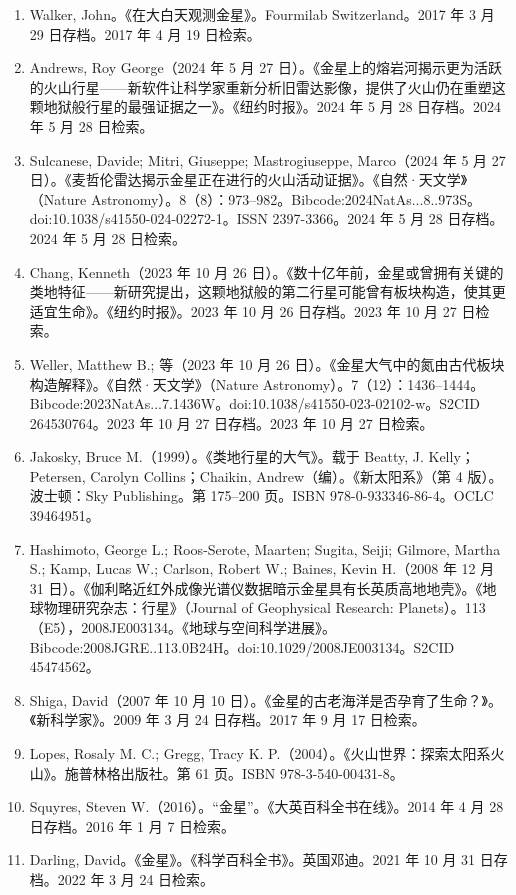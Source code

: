 \begin{enumerate}
\item Walker, John。《在大白天观测金星》。Fourmilab Switzerland。2017 年 3 月 29 日存档。2017 年 4 月 19 日检索。
\item Andrews, Roy George（2024 年 5 月 27 日）。《金星上的熔岩河揭示更为活跃的火山行星——新软件让科学家重新分析旧雷达影像，提供了火山仍在重塑这颗地狱般行星的最强证据之一》。《纽约时报》。2024 年 5 月 28 日存档。2024 年 5 月 28 日检索。
\item Sulcanese, Davide; Mitri, Giuseppe; Mastrogiuseppe, Marco（2024 年 5 月 27 日）。《麦哲伦雷达揭示金星正在进行的火山活动证据》。《自然·天文学》（Nature Astronomy）。8（8）：973–982。Bibcode:2024NatAs...8..973S。doi:10.1038/s41550-024-02272-1。ISSN 2397-3366。2024 年 5 月 28 日存档。2024 年 5 月 28 日检索。
\item Chang, Kenneth（2023 年 10 月 26 日）。《数十亿年前，金星或曾拥有关键的类地特征——新研究提出，这颗地狱般的第二行星可能曾有板块构造，使其更适宜生命》。《纽约时报》。2023 年 10 月 26 日存档。2023 年 10 月 27 日检索。
\item Weller, Matthew B.; 等（2023 年 10 月 26 日）。《金星大气中的氮由古代板块构造解释》。《自然·天文学》（Nature Astronomy）。7（12）：1436–1444。Bibcode:2023NatAs...7.1436W。doi:10.1038/s41550-023-02102-w。S2CID 264530764。2023 年 10 月 27 日存档。2023 年 10 月 27 日检索。
\item Jakosky, Bruce M.（1999）。《类地行星的大气》。载于 Beatty, J. Kelly；Petersen, Carolyn Collins；Chaikin, Andrew（编）。《新太阳系》（第 4 版）。波士顿：Sky Publishing。第 175–200 页。ISBN 978-0-933346-86-4。OCLC 39464951。
\item Hashimoto, George L.; Roos-Serote, Maarten; Sugita, Seiji; Gilmore, Martha S.; Kamp, Lucas W.; Carlson, Robert W.; Baines, Kevin H.（2008 年 12 月 31 日）。《伽利略近红外成像光谱仪数据暗示金星具有长英质高地地壳》。《地球物理研究杂志：行星》（Journal of Geophysical Research: Planets）。113（E5），2008JE003134。《地球与空间科学进展》。Bibcode:2008JGRE..113.0B24H。doi:10.1029/2008JE003134。S2CID 45474562。
\item Shiga, David（2007 年 10 月 10 日）。《金星的古老海洋是否孕育了生命？》。《新科学家》。2009 年 3 月 24 日存档。2017 年 9 月 17 日检索。
\item Lopes, Rosaly M. C.; Gregg, Tracy K. P.（2004）。《火山世界：探索太阳系火山》。施普林格出版社。第 61 页。ISBN 978-3-540-00431-8。
\item Squyres, Steven W.（2016）。“金星”。《大英百科全书在线》。2014 年 4 月 28 日存档。2016 年 1 月 7 日检索。
\item Darling, David。《金星》。《科学百科全书》。英国邓迪。2021 年 10 月 31 日存档。2022 年 3 月 24 日检索。

\end{enumerate}
